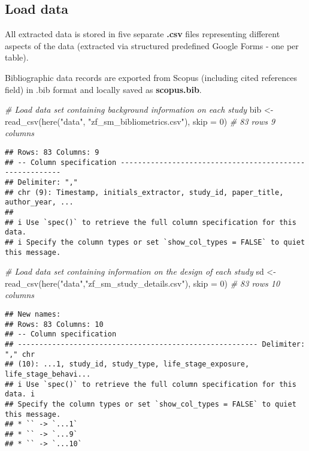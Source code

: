 \documentclass[
]{article}
\newenvironment{Shaded}{\begin{snugshade}}{\end{snugshade}}
\newcommand{\AttributeTok}[1]{\textcolor[rgb]{0.77,0.63,0.00}{#1}}
\newcommand{\CommentTok}[1]{\textcolor[rgb]{0.56,0.35,0.01}{\textit{#1}}}
\newcommand{\DecValTok}[1]{\textcolor[rgb]{0.00,0.00,0.81}{#1}}
\newcommand{\FunctionTok}[1]{\textcolor[rgb]{0.00,0.00,0.00}{#1}}
\newcommand{\NormalTok}[1]{#1}
\newcommand{\OtherTok}[1]{\textcolor[rgb]{0.56,0.35,0.01}{#1}}
\newcommand{\StringTok}[1]{\textcolor[rgb]{0.31,0.60,0.02}{#1}}
\begin{document}
\hypertarget{load-data}{%
\subsection{Load data}\label{load-data}}

All extracted data is stored in five separate \textbf{.csv} files
representing different aspects of the data (extracted via structured
predefined Google Forms - one per table).

Bibliographic data records are exported from Scopus (including cited
references field) in .bib format and locally saved as
\textbf{scopus.bib}.

\begin{Shaded}
\begin{Highlighting}[]
\CommentTok{\# Load data set containing background information on each study}
\NormalTok{bib }\OtherTok{\textless{}{-}} \FunctionTok{read\_csv}\NormalTok{(}\FunctionTok{here}\NormalTok{(}\StringTok{"data"}\NormalTok{, }\StringTok{"zf\_sm\_bibliometrics.csv"}\NormalTok{), }\AttributeTok{skip =} \DecValTok{0}\NormalTok{) }\CommentTok{\# 83 rows 9 columns }
\end{Highlighting}
\end{Shaded}

\begin{verbatim}
## Rows: 83 Columns: 9
## -- Column specification --------------------------------------------------------
## Delimiter: ","
## chr (9): Timestamp, initials_extractor, study_id, paper_title, author_year, ...
## 
## i Use `spec()` to retrieve the full column specification for this data.
## i Specify the column types or set `show_col_types = FALSE` to quiet this message.
\end{verbatim}

\begin{Shaded}
\begin{Highlighting}[]
\CommentTok{\# Load data set containing information on the design of each study }
\NormalTok{sd }\OtherTok{\textless{}{-}} \FunctionTok{read\_csv}\NormalTok{(}\FunctionTok{here}\NormalTok{(}\StringTok{"data"}\NormalTok{,}\StringTok{"zf\_sm\_study\_details.csv"}\NormalTok{), }\AttributeTok{skip =} \DecValTok{0}\NormalTok{) }\CommentTok{\#  83 rows 10 columns }
\end{Highlighting}
\end{Shaded}

\begin{verbatim}
## New names:
## Rows: 83 Columns: 10
## -- Column specification
## -------------------------------------------------------- Delimiter: "," chr
## (10): ...1, study_id, study_type, life_stage_exposure, life_stage_behavi...
## i Use `spec()` to retrieve the full column specification for this data. i
## Specify the column types or set `show_col_types = FALSE` to quiet this message.
## * `` -> `...1`
## * `` -> `...9`
## * `` -> `...10`
\end{verbatim}
\end{document}
